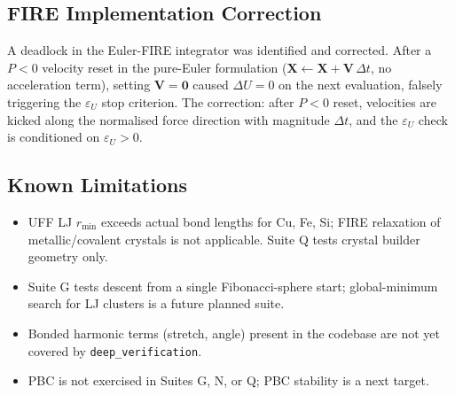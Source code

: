 \documentclass[11pt]{article}
\begin{document}
\subsection{FIRE Implementation Correction}

A deadlock in the Euler-FIRE integrator was identified and corrected.
After a $P < 0$ velocity reset in the pure-Euler formulation
($\mathbf{X} \leftarrow \mathbf{X} + \mathbf{V}\,\Delta t$, no acceleration
term), setting $\mathbf{V} = \mathbf{0}$ caused $\Delta U = 0$ on the next
evaluation, falsely triggering the $\varepsilon_U$ stop criterion.
The correction: after $P < 0$ reset, velocities are kicked along the
normalised force direction with magnitude $\Delta t$, and the $\varepsilon_U$
check is conditioned on $\varepsilon_U > 0$.

\subsection{Known Limitations}

\begin{itemize}
\item UFF LJ $r_\mathrm{min}$ exceeds actual bond lengths for Cu, Fe, Si;
  FIRE relaxation of metallic/covalent crystals is not applicable.
  Suite Q tests crystal builder geometry only.
\item Suite G tests descent from a single Fibonacci-sphere start; global-minimum
  search for LJ clusters is a future planned suite.
\item Bonded harmonic terms (stretch, angle) present in the codebase are not
  yet covered by \texttt{deep\_verification}.
\item PBC is not exercised in Suites G, N, or Q; PBC stability is a next target.
\end{itemize}
\end{document}
